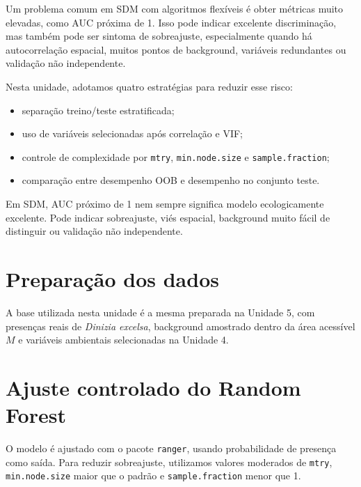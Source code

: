 Um problema comum em SDM com algoritmos flexíveis é obter métricas muito elevadas, como AUC próxima de 1. Isso pode indicar excelente discriminação, mas também pode ser sintoma de sobreajuste, especialmente quando há autocorrelação espacial, muitos pontos de background, variáveis redundantes ou validação não independente.

Nesta unidade, adotamos quatro estratégias para reduzir esse risco:

\begin{itemize}
	\item separação treino/teste estratificada;
	\item uso de variáveis selecionadas após correlação e VIF;
	\item controle de complexidade por \texttt{mtry}, \texttt{min.node.size} e \texttt{sample.fraction};
	\item comparação entre desempenho OOB e desempenho no conjunto teste.
\end{itemize}

\begin{atencao}[title={\faExclamationTriangle\quad AUC muito alto exige cautela}]
	Em SDM, AUC próximo de 1 nem sempre significa modelo ecologicamente excelente. Pode indicar sobreajuste, viés espacial, background muito fácil de distinguir ou validação não independente.
\end{atencao}

\section{Preparação dos dados}

A base utilizada nesta unidade é a mesma preparada na Unidade 5, com presenças reais de \textit{Dinizia excelsa}, background amostrado dentro da área acessível \(M\) e variáveis ambientais selecionadas na Unidade 4.



\section{Ajuste controlado do Random Forest}

O modelo é ajustado com o pacote \texttt{ranger}, usando probabilidade de presença como saída. Para reduzir sobreajuste, utilizamos valores moderados de \texttt{mtry}, \texttt{min.node.size} maior que o padrão e \texttt{sample.fraction} menor que 1.

